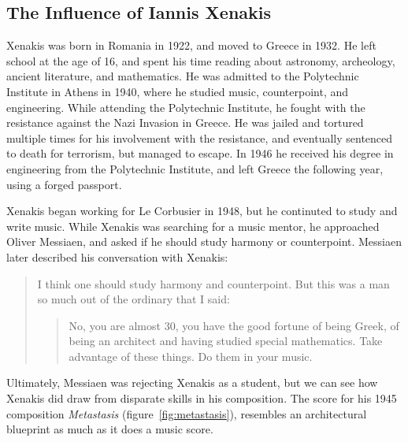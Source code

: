 \documentclass{tufte-book}
\begin{document}
\subsection{The Influence of Iannis Xenakis}
\label{sec:influence-xenakis}

Xenakis was born in Romania in 1922, and moved to Greece in 1932. He
left school at the age of 16, and spent his time reading about
astronomy, archeology, ancient literature, and
mathematics.\cite[]{Hoffmann2015} He was admitted to the
Polytechnic Institute in Athens in 1940, where he studied music,
counterpoint, and engineering. While attending the Polytechnic
Institute, he fought with the resistance against the Nazi Invasion in
Greece. He was jailed and tortured multiple times for his involvement
with the resistance, and eventually sentenced to death for terrorism,
but managed to escape\cite[]{Simms2014}. In 1946 he received his
degree in engineering from the Polytechnic Institute, and left Greece
the following year, using a forged passport.\cite[]{Prendergast2014}

Xenakis began working for Le Corbusier in 1948, but he continuted to
study and write music. While Xenakis was searching for a music mentor,
he approached Oliver Messiaen, and asked if he should study harmony or
counterpoint. Messiaen later described his conversation with
Xenakis:\cite{Service2013}
\begin{quotation}
  I think one should study harmony and counterpoint. But this was a
  man so much out of the ordinary that I said: \begin{quote}No, you
    are almost 30, you have the good fortune of being Greek, of being
    an architect and having studied special mathematics. Take
    advantage of these things. Do them in your music.\end{quote}
\end{quotation}
Ultimately, Messiaen was rejecting Xenakis as a student, but we can
see how Xenakis did draw from disparate skills in his composition. The
score for his 1945 composition \textit{Metastasis}
(figure~\ref{fig:metastasis}), resembles an architectural blueprint as
much as it does a music score.
\end{document}
